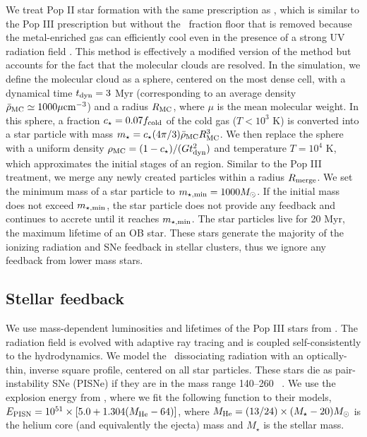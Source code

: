 \documentclass[apjl]{emulateapj}
\begin{document}
We treat Pop II star formation with the same prescription as
\citet{Wise09}, which is similar to the Pop III prescription but
without the \hh~fraction floor that is removed because the
metal-enriched gas can efficiently cool even in the presence of a
strong UV radiation field \citep[e.g.][]{Safranek10}.  This method is
effectively a modified version of the \citet{Cen92} method but
accounts for the fact that the molecular clouds are resolved.  In the
simulation, we define the molecular cloud as a sphere, centered on the
most dense cell, with a dynamical time $t_{\rm dyn} = 3$ Myr
(corresponding to an average density $\bar{\rho}_{\rm MC} \simeq
1000\mu \cubecm$) and a radius $R_{\rm MC}$, where $\mu$ is the mean
molecular weight.  In this sphere, a fraction $c_\star = 0.07 f_{\rm
  cold}$ of the cold gas ($T < 10^3$ K) is converted into a star
particle with mass $m_\star = c_\star (4\pi/3) \bar{\rho}_{\rm MC}
R_{\rm MC}^3$.  We then replace the sphere with a uniform density
$\rho_{\rm MC} = (1 - c_\star) / (Gt_{\rm dyn}^2)$ and temperature $T
= 10^4$ K, which approximates the initial stages of an 
region.  Similar to the Pop III treatment, we merge any newly created
particles within a radius $R_{\rm merge}$.  We set the minimum mass of
a star particle to $m_{\rm \star, min} = 1000 \Ms$.  If the initial
mass does not exceed $m_{\rm \star, min}$, the star particle does not
provide any feedback and continues to accrete until it reaches $m_{\rm
  \star, min}$.  The star particles live for 20 Myr, the maximum
lifetime of an OB star.  These stars generate the majority of the
ionizing radiation and SNe feedback in stellar clusters, thus we
ignore any feedback from lower mass stars.

\subsection{Stellar feedback}

We use mass-dependent luminosities and lifetimes of the Pop III stars
from \citet{Schaerer02}.  The radiation field is evolved with adaptive
ray tracing \citep{Abel02_RT, Wise10} and is coupled self-consistently
to the hydrodynamics.  We model the \hh~dissociating radiation with an
optically-thin, inverse square profile, centered on all star
particles.  These stars die as pair-instability SNe (PISNe) if they
are in the mass range 140--260 \Ms~\citep{Heger03}.  We use the
explosion energy from \citet{Heger02}, where we fit the following
function to their models, $E_{\rm PISN} = 10^{51} \times [5.0 + 1.304
  (M_{\rm He} - 64)]$, where $M_{\rm He} = (13/24) \times (M_\star -
20) \Ms$ is the helium core (and equivalently the ejecta) mass and
$M_\star$ is the stellar mass.
\end{document}
